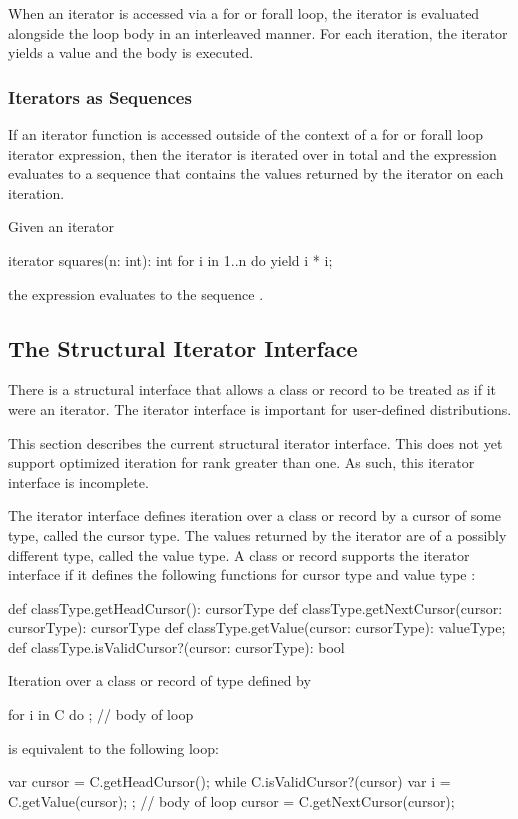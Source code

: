When an iterator is accessed via a for or forall loop, the iterator is
evaluated alongside the loop body in an interleaved manner.  For each
iteration, the iterator yields a value and the body is executed.

\subsubsection{Iterators as Sequences}
\label{Iterators_as_Sequences}

If an iterator function is accessed outside of the context of a for or
forall loop iterator expression, then the iterator is iterated over in
total and the expression evaluates to a sequence that contains the
values returned by the iterator on each iteration.
\begin{example}
Given an iterator
\begin{chapel}
iterator squares(n: int): int {
  for i in 1..n do
    yield i * i;
}
\end{chapel}
the expression  evaluates to the sequence .
\end{example}

\subsection{The Structural Iterator Interface}
\label{Iterator_Interface}

There is a structural interface that allows a class or record to be
treated as if it were an iterator.  The iterator interface is
important for user-defined distributions.

\begin{status}
This section describes the current structural iterator interface.
This does not yet support optimized iteration for rank greater than
one.  As such, this iterator interface is incomplete.
\end{status}

The iterator interface defines iteration over a class or record by a
cursor of some type, called the cursor type.  The values returned by
the iterator are of a possibly different type, called the value type.
A class or record  supports the iterator interface if
it defines the following functions for cursor type 
and value type :
\begin{chapel}
def classType.getHeadCursor(): cursorType
def classType.getNextCursor(cursor: cursorType): cursorType
def classType.getValue(cursor: cursorType): valueType;
def classType.isValidCursor?(cursor: cursorType): bool
\end{chapel}

Iteration over a class or record  of type 
defined by
\begin{chapel}
for i in C do
  ; // body of loop
\end{chapel}
is equivalent to the following loop:
\begin{chapel}
var cursor = C.getHeadCursor();
while C.isValidCursor?(cursor) {
  var i = C.getValue(cursor);
  ; // body of loop
  cursor = C.getNextCursor(cursor);
}
\end{chapel}
